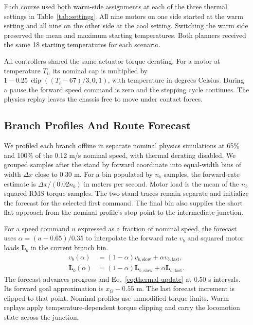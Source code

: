 \documentclass{ieeeaccess}
\begin{document}
Each course used both warm-side assignments at each of the three thermal settings in Table~\ref{tab:settings}. All nine motors on one side started at the warm setting and all nine on the other side at the cool setting. Switching the warm side preserved the mean and maximum starting temperatures. Both planners received the same 18 starting temperatures for each scenario.

All controllers shared the same actuator torque derating. For a motor at temperature $T_i$, its nominal cap is multiplied by $1-0.25\,\operatorname{clip}((T_i-67)/3,0,1)$, with temperature in degrees Celsius. During a pause the forward speed command is zero and the stepping cycle continues. The physics replay leaves the chassis free to move under contact forces.

\subsection{Branch Profiles And Route Forecast}

We profiled each branch offline in separate nominal physics simulations at 65\% and 100\% of the 0.12 m/s nominal speed, with thermal derating disabled. We grouped samples after the stand by forward coordinate into equal-width bins of width $\Delta x$ close to 0.30 m. For a bin populated by $n_b$ samples, the forward-rate estimate is $\Delta x/(0.02 n_b)$ in meters per second. Motor load is the mean of the $n_b$ squared RMS torque samples. The two stand traces remain separate and initialize the forecast for the selected first command. The final bin also supplies the short flat approach from the nominal profile's stop point to the intermediate junction.

For a speed command $u$ expressed as a fraction of nominal speed, the forecast uses $\alpha=(u-0.65)/0.35$ to interpolate the forward rate $v_b$ and squared motor loads $\mathbf{L}_b$ in the current branch bin.
\begin{align}
 v_b(\alpha)&=(1-\alpha)v_{b,\mathrm{slow}}+\alpha v_{b,\mathrm{fast}},\\
 \mathbf{L}_b(\alpha)&=(1-\alpha)\mathbf{L}_{b,\mathrm{slow}}
                        +\alpha\mathbf{L}_{b,\mathrm{fast}} .
\end{align}
The forecast advances progress and Eq.~\eqref{eq:thermal-update} at 0.50 s intervals. Its forward goal approximation is $x_G-0.55$ m. The last forecast increment is clipped to that point. Nominal profiles use unmodified torque limits. Warm replays apply temperature-dependent torque clipping and carry the locomotion state across the junction.
\end{document}
